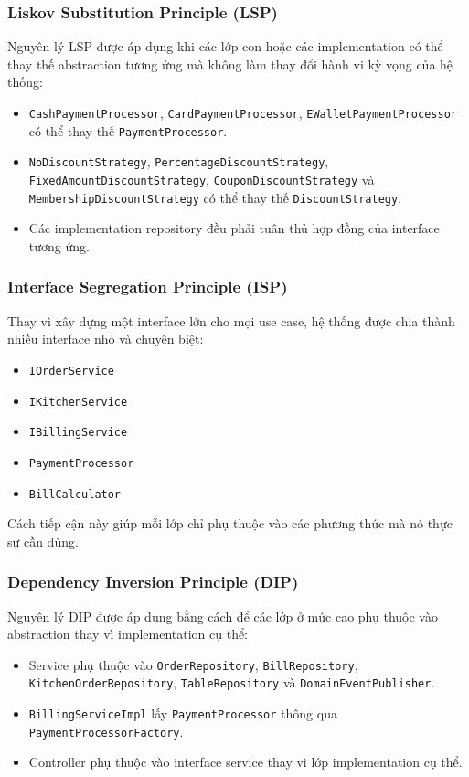\documentclass[12pt,a4paper]{article}
\begin{document}
\subsubsection{Liskov Substitution Principle (LSP)}

Nguyên lý LSP được áp dụng khi các lớp con hoặc các implementation có thể thay thế abstraction tương ứng mà không làm thay đổi hành vi kỳ vọng của hệ thống:
\begin{itemize}
    \item \texttt{CashPaymentProcessor}, \texttt{CardPaymentProcessor}, \texttt{EWalletPaymentProcessor} có thể thay thế \texttt{PaymentProcessor}.
    \item \texttt{NoDiscountStrategy}, \texttt{PercentageDiscountStrategy}, \texttt{FixedAmountDiscountStrategy}, \texttt{CouponDiscountStrategy} và \texttt{MembershipDiscountStrategy} có thể thay thế \texttt{DiscountStrategy}.
    \item Các implementation repository đều phải tuân thủ hợp đồng của interface tương ứng.
\end{itemize}

\subsubsection{Interface Segregation Principle (ISP)}

Thay vì xây dựng một interface lớn cho mọi use case, hệ thống được chia thành nhiều interface nhỏ và chuyên biệt:
\begin{itemize}
    \item \texttt{IOrderService}
    \item \texttt{IKitchenService}
    \item \texttt{IBillingService}
    \item \texttt{PaymentProcessor}
    \item \texttt{BillCalculator}
\end{itemize}

Cách tiếp cận này giúp mỗi lớp chỉ phụ thuộc vào các phương thức mà nó thực sự cần dùng.

\subsubsection{Dependency Inversion Principle (DIP)}

Nguyên lý DIP được áp dụng bằng cách để các lớp ở mức cao phụ thuộc vào abstraction thay vì implementation cụ thể:
\begin{itemize}
    \item Service phụ thuộc vào \texttt{OrderRepository}, \texttt{BillRepository}, \texttt{KitchenOrderRepository}, \texttt{TableRepository} và \texttt{DomainEventPublisher}.
    \item \texttt{BillingServiceImpl} lấy \texttt{PaymentProcessor} thông qua \texttt{PaymentProcessorFactory}.
    \item Controller phụ thuộc vào interface service thay vì lớp implementation cụ thể.
\end{itemize}
\end{document}
